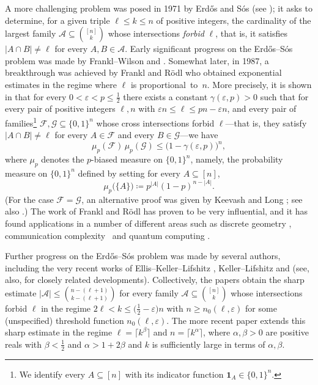 \documentclass[10pt,a4paper]{amsart}
\theoremstyle{remark}
\newcommand{\ee}{\varepsilon}
\newcommand{\meg}{\geqslant}
\newcommand{\mik}{\leqslant}
\newcommand{\Fcal}{\mathcal{F}}
\newcommand{\Gcal}{\mathcal{G}}
\begin{document}
A more challenging problem was posed in 1971 by Erd\H{o}s and S\'{o}s (see \cite{Erd75}); it asks to determine,
for a given triple $\ell\mik k\mik n$ of positive integers, the cardinality of the largest family
$\mathcal{A}\subseteq \binom{[n]}{k}$ whose intersections \textit{forbid} $\ell$, that is, it satisfies
$|A\cap B|\neq \ell$ for every $A,B\in\mathcal{A}$. Early significant progress on the Erd\H{o}s--S\'{o}s problem
was made by Frankl--Wilson \cite{FW81} and  \cite{FF85}. Somewhat later, in 1987,
a breakthrough was achieved by Frankl and R\"{o}dl who obtained exponential estimates in the regime where
$\ell$ is proportional~to~$n$. More precisely, it is shown in \cite[Theorem 1.5]{FR87} that for
every $0<\ee<p\mik \frac12$ there exists a constant $\gamma(\ee,p)>0$ such that for every pair of
positive integers $\ell,n$ with $\ee n\mik \ell\mik pn-\ee n$, and every pair of families\footnote{We
identify every $A\subseteq [n]$ with its indicator function $\mathbf{1}_A\in \{0,1\}^n$.}
$\Fcal,\Gcal\subseteq \{0,1\}^n$ whose cross intersections forbid $\ell$---that is, they satisfy
$|A\cap B|\neq \ell$ for every $A\in\Fcal$ and every $B\in\Gcal$---we have
\begin{equation} \label{e1.1}
\mu_p(\Fcal)\, \mu_p(\Gcal) \mik \big(1-\gamma(\ee,p)\big)^n,
\end{equation}
where $\mu_p$ denotes the $p$-biased measure on $\{0,1\}^n$, namely, the probability measure
on $\{0,1\}^n$ defined by setting for every $A\subseteq [n]$,
\begin{equation} \label{e1.2}
\mu_p\big(\{A\}\big) \coloneqq p^{|A|} (1-p)^{n-|A|}.
\end{equation}
(For the case $\Fcal=\Gcal$, an alternative proof was given by Keevash and Long \cite{KLo16}; see also \cite{KSZ22}.)
The work of Frankl and R\"{o}dl has proven to be very influential, and it has found applications
in a number of different areas such as discrete geometry \cite{FR90},
communication complexity~\cite{S99} and quantum computing \cite{BCW99}.

Further progress on the Erd\H{o}s--S\'{o}s problem was made by several authors, including the very recent
works of Ellis--Keller--Lifshitz \cite{EKL24}, Keller--Lifshitz \cite{KLi21} and  \cite{KZ24}
(see, also, \cite{KLLM23,KLo20} for closely related developments). Collectively, the papers \cite{EKL24,KLi21}
obtain the sharp estimate $|\mathcal{A}|\mik \binom{n-(\ell+1)}{k-(\ell+1)}$ for every family
$\mathcal{A}\subseteq \binom{[n]}{k}$ whose intersections forbid $\ell$ in the regime
$2\ell< k\mik \big(\frac12-\ee\big)n$ with $n\meg n_0(\ell,\ee)$ for some (unspecified)
threshold function $n_0(\ell,\ee)$. The more recent paper \cite{KZ24} extends this sharp estimate in the regime
$\ell=\lceil k^\beta\rceil$ and $n=\lceil k^\alpha\rceil$, where $\alpha,\beta>0$ are positive reals
with $\beta<\frac12$ and $\alpha>1+2\beta$ and $k$ is sufficiently large in terms of $\alpha,\beta$.
\end{document}

